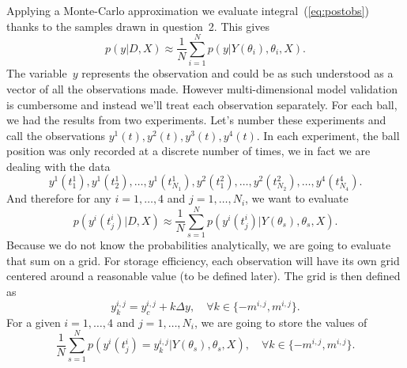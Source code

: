 \documentclass{article}
\begin{document}
Applying a Monte-Carlo approximation we evaluate integral~(\ref{eq:postobs}) thanks to the samples drawn in question~2. This gives
\begin{equation} \label{eq:postobsmc} 
p(y | D, X) \approx \frac1N \sum_{i=1}^N p(y | Y(\theta_i), \theta_i, X ) . 
\end{equation}
The variable~$y$ represents the observation and could be as such understood as a vector of all the observations made. 
However multi-dimensional model validation is cumbersome and instead we'll treat each observation separately.
For each ball, we had the results from two experiments. Let's number these experiments and call the observations $y^1(t), y^2(t), y^3(t), y^4(t)$.
In each experiment, the ball position was only recorded at a discrete number of times, we in fact we are dealing with the data
\[ y^1(t^1_1), y^1(t^1_2), \ldots, y^1(t^1_{N_1}), y^2(t^2_1), \ldots, y^2(t^2_{N_2}), \ldots, y^4(t^4_{N_4}) . \]
And therefore for any $i = 1, \ldots, 4$ and $j = 1, \ldots , N_i$, we want to evaluate
\[ p(y^i(t^i_j) | D, X) \approx \frac1N \sum_{s=1}^N p(y^i(t^i_j) | Y(\theta_s), \theta_s, X ) . \]
Because we do not know the probabilities analytically, we are going to evaluate that sum on a grid.
For storage efficiency, each observation will have its own grid centered around a reasonable value (to be defined later).
The grid is then defined as
\[ y^{i,j}_k= y^{i,j}_c + k \Delta y, \quad \forall k \in \{ -m^{i,j}, m^{i,j} \} . \]
For a given $i = 1, \ldots, 4$ and $j = 1, \ldots, N_i$, we are going to store the values of
\[ \frac1N \sum_{s=1}^N p(y^i(t^i_j) = y^{i,j}_k | Y(\theta_s), \theta_s, X ), \quad \forall k \in \{-m^{i,j}, m^{i,j}\} . \]
\end{document}
